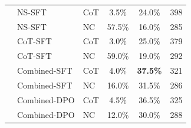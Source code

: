 \begin{table}[t]
\begin{tabular}{ll l ccc}
           & NS-SFT        & CoT &  3.5\% & 24.0\%          & 398 \\
           & NS-SFT        & NC  & 57.5\% & 16.0\%          & 285 \\
           & CoT-SFT       & CoT &  3.0\% & 25.0\%          & 379 \\
           & CoT-SFT       & NC  & 59.0\% & 19.0\%          & 292 \\
           & Combined-SFT  & CoT &  4.0\% & \textbf{37.5\%} & 321 \\
           & Combined-SFT  & NC  & 16.0\% & 31.5\%          & 286 \\
           & Combined-DPO  & CoT &  4.5\% & 36.5\%          & 325 \\
           & Combined-DPO  & NC  & 12.0\% & 30.0\%          & 288 \\
\bottomrule
\end{tabular}
\end{table}
